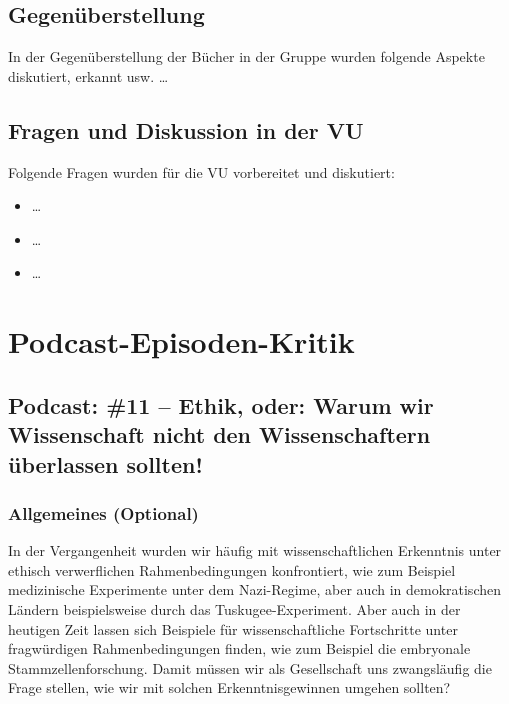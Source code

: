 \documentclass[twoside, a4paper, DIV=11, open=any, bibliography=totoc]{scrbook}
\begin{document}
\section{Gegenüberstellung} \label{sec:litgegenueber}

In der Gegenüberstellung der Bücher in der Gruppe wurden folgende Aspekte diskutiert, erkannt usw. \ldots

\section{Fragen und Diskussion in der VU} \label{sec:fragenvu}

Folgende Fragen wurden für die VU vorbereitet und diskutiert:

\begin{itemize}
    \item \ldots
    \item \ldots
    \item \ldots
\end{itemize}


\chapter{Podcast-Episoden-Kritik} \label{chap:podkrit}


\section{Podcast: \#11 -- Ethik, oder: Warum wir Wissenschaft nicht den Wissenschaftern überlassen sollten!}

\subsection{Allgemeines (Optional)}

In der Vergangenheit wurden wir häufig mit wissenschaftlichen Erkenntnis unter
ethisch verwerflichen Rahmenbedingungen konfrontiert, wie zum Beispiel medizinische
Experimente unter dem Nazi-Regime, aber auch in demokratischen Ländern beispielsweise durch das Tuskugee-Experiment.
Aber auch in der heutigen Zeit lassen sich Beispiele für wissenschaftliche Fortschritte
unter fragwürdigen Rahmenbedingungen finden, wie zum Beispiel die embryonale Stammzellenforschung.
Damit müssen wir als Gesellschaft uns zwangsläufig die Frage stellen, wie wir mit solchen Erkenntnisgewinnen
umgehen sollten?
\end{document}
